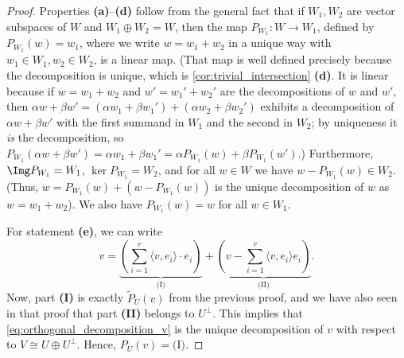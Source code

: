 \begin{proof}
Properties \textbf{(a)}--\textbf{(d)} follow from the general fact that if $W_1, W_2$ are vector subspaces of $W$ and $W_1 \oplus W_2 = W$, then the map $P_{W_1} \colon W \to W_1$, defined by $P_{W_1}(w) = w_1$, where we write $w = w_1 + w_2$ in a unique way with $w_1 \in W_1, w_2 \in W_2$, is a linear map. (That map is well defined precisely because the decomposition is unique, which is \cref{cor:trivial_intersection} \textbf{(d)}. It is linear because if $w = w_1 + w_2$ and $w' = w_1' + w_2'$ are the decompositions of $w$ and $w'$, then $\alpha w + \beta w' = (\alpha w_1 + \beta w_1') + (\alpha w_2 + \beta w_2')$ exhibits a decomposition of $\alpha w + \beta w'$ with the first summand in $W_1$ and the second in $W_2$; by uniqueness it \emph{is} the decomposition, so $P_{W_1}(\alpha w + \beta w') = \alpha w_1 + \beta w_1' = \alpha P_{W_1}(w) + \beta P_{W_1}(w')$.) Furthermore, $\Img P_{W_1} = W_1$, $\ker P_{W_1} = W_2$, and for all $w \in W$ we have $w - P_{W_1}(w) \in W_2$. (Thus, $w = P_{W_1}(w) + (w - P_{W_1}(w))$ is the unique decomposition of $w$ as $w = w_1 + w_2$). We also have $P_{W_1}(w) = w$ for all $w \in W_1$.

For statement \textbf{(e)}, we can write
\begin{equation}
\label{eq:orthogonal_decomposition_v}
    v = \underbrace{\left( \sum_{i=1}^r \langle v, e_i \rangle \cdot e_i \right)}_{\text{(I)}} + \underbrace{\left( v - \sum_{i=1}^r \langle v, e_i \rangle e_i \right)}_{\text{(II)}}.
\end{equation}
Now, part \textbf{(I)} is exactly $\widetilde{P}_U(v)$ from the previous proof, and we have also seen in that proof that part \textbf{(II)} belongs to $U^\perp$. This implies that \eqref{eq:orthogonal_decomposition_v} is the unique decomposition of $v$ with respect to $V \cong U \oplus U^\perp$. Hence, $P_U(v) = \text{(I)}$.
\end{proof}

